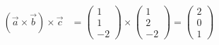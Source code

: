 \begin{solution}
\begin{align}
	(\vec a \times  \vec b) \times \vec c &= \left ( \begin{array}{c}1\\1\\-2 \end{array} \right ) \times \left ( \begin{array}{c}1\\2\\-2 \end{array} \right ) = \left ( \begin{array}{c}2\\0\\1 \end{array} \right )
\end{align}
\end{solution}